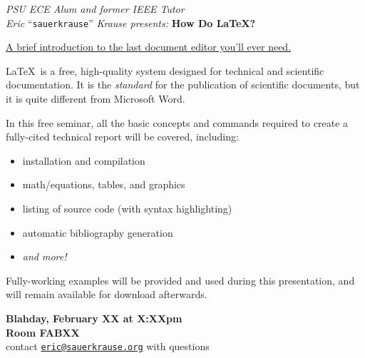 \documentclass{article}
\begin{document}
    \begin{center} \LARGE
        \vspace*{.5in}
        \textit{PSU ECE Alum and former IEEE Tutor}\\
        \textit{Eric} ``\texttt{sauerkrause}'' \textit{Krause presents:} \vspace{.45in}
        {\Huge \bf How Do \LaTeX?}\\\vspace{.35in}
    
        \LARGE\underline{A brief introduction to the last document editor you'll ever need.}\vspace{.2in}
    \end{center}

    \Large\LaTeX\ is a  free, high-quality system designed for technical and scientific documentation. It is the \emph{standard} for the publication of scientific documents, but it is quite different from Microsoft Word.\vspace{.2in}

    In this free seminar, all the basic concepts and commands required to create a fully-cited technical report will be covered, including:
    \begin{itemize}
        \item installation and compilation
        \item math/equations, tables, and graphics
        \item listing of source code (with syntax highlighting)
        \item automatic bibliography generation
        \item \emph{and more!}
    \end{itemize}\vspace{.2in}

    Fully-working examples will be provided and used during this presentation, and will remain available for download afterwards. 
  
    \begin{center} \Huge
        \textbf{Blahday, February XX at X:XXpm\\Room FABXX\\}\vspace{.2in}
        \Large contact \texttt{\href{mailto:eric@sauerkrause.org}{eric@sauerkrause.org}} with questions
    \end{center}
\end{document}
